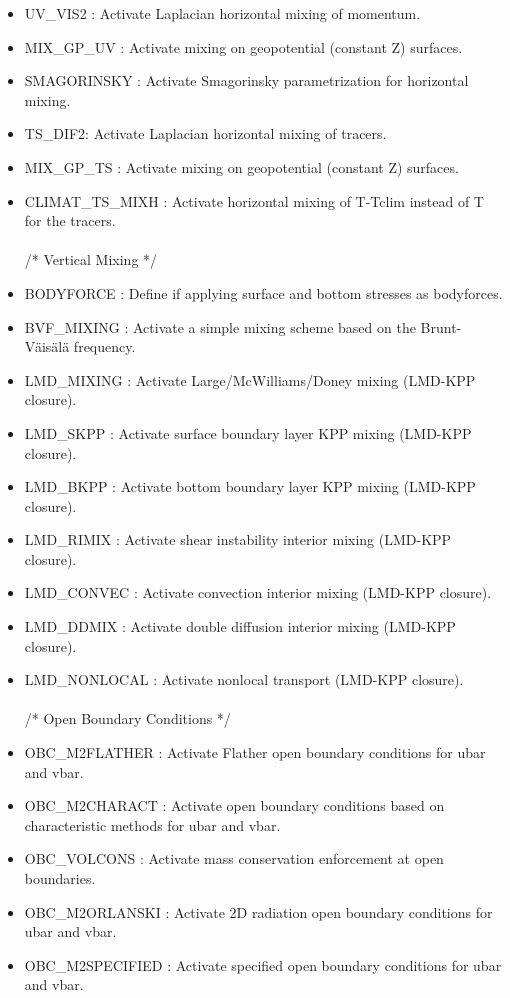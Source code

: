\begin{itemize}
\item UV\_VIS2 : Activate Laplacian horizontal mixing of momentum.
\item MIX\_GP\_UV : Activate mixing on geopotential (constant Z) surfaces.
\item SMAGORINSKY : Activate Smagorinsky parametrization for horizontal mixing.
\item TS\_DIF2: Activate Laplacian horizontal mixing of tracers.
\item MIX\_GP\_TS : Activate mixing on geopotential (constant Z) surfaces.
\item CLIMAT\_TS\_MIXH : Activate horizontal mixing of T-Tclim instead of T for the tracers.
\\ \\ /*                       Vertical Mixing */
\item BODYFORCE : Define if applying surface and bottom stresses as bodyforces.
\item BVF\_MIXING : Activate a simple mixing scheme based on the Brunt-V\"ais\"al\"a frequency.
\item LMD\_MIXING : Activate Large/McWilliams/Doney mixing (LMD-KPP closure).
\item LMD\_SKPP : Activate surface boundary layer KPP mixing (LMD-KPP closure). 
\item LMD\_BKPP : Activate bottom boundary layer KPP mixing (LMD-KPP closure). 
\item LMD\_RIMIX : Activate shear instability interior mixing (LMD-KPP closure).
\item LMD\_CONVEC : Activate convection interior mixing (LMD-KPP closure).
\item LMD\_DDMIX : Activate double diffusion interior mixing (LMD-KPP closure). 
\item LMD\_NONLOCAL : Activate nonlocal transport (LMD-KPP closure). 
\\ \\ /*                       Open Boundary Conditions */
\item OBC\_M2FLATHER :  Activate Flather open boundary conditions for ubar and vbar.
\item OBC\_M2CHARACT  :  Activate open boundary conditions based on characteristic methods 
for ubar and vbar.
\item OBC\_VOLCONS : Activate mass conservation enforcement at open boundaries.
\item OBC\_M2ORLANSKI : Activate 2D radiation open boundary conditions for ubar and vbar.
\item OBC\_M2SPECIFIED : Activate specified open boundary conditions for ubar and vbar.

\end{itemize}
